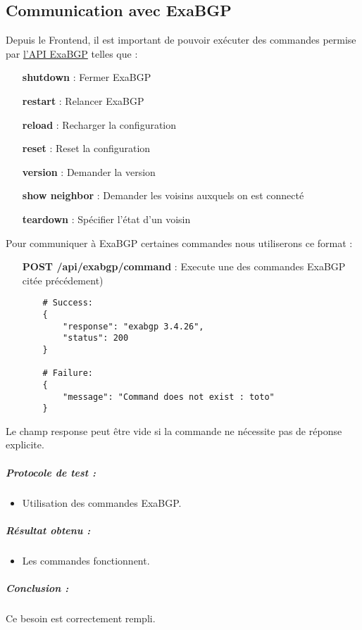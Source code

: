 \subsection{Communication avec ExaBGP}
\label{sssec:exabgp}
\noindent
Depuis le Frontend, il est important de pouvoir exécuter des commandes permise par \href{https://github.com/Exa-Networks/exabgp/wiki/Controlling-ExaBGP-:-interacting-from-the-API}{l'API ExaBGP} telles que :
\begin{itemize}
    \item[\textbf{shutdown}] : Fermer ExaBGP
    \item[\textbf{restart}] : Relancer ExaBGP
    \item[\textbf{reload}] : Recharger la configuration
    \item[\textbf{reset}] : Reset la configuration
    \item[\textbf{version}] : Demander la version
    \item[\textbf{show neighbor}] : Demander les voisins auxquels on est connecté
    \item[\textbf{teardown}] : Spécifier l'état d'un voisin
\end{itemize}

\vspace{1em}

Pour communiquer à ExaBGP certaines commandes nous utiliserons ce format :
\begin{itemize}

    \item [\textbf{POST /api/exabgp/command}] : Execute une des commandes ExaBGP citée précédement)
    \begin{verbatim}
    # Success:
    {
        "response": "exabgp 3.4.26",
        "status": 200
    }

    # Failure:
    {
        "message": "Command does not exist : toto"
    }
    \end{verbatim}

\end{itemize}

Le champ response peut être vide si la commande ne nécessite pas de réponse explicite.

\subparagraph{Protocole de test :}
\begin{itemize}
    \item Utilisation des commandes ExaBGP.
\end{itemize}
\subparagraph{Résultat obtenu :}
    \begin{itemize}
    \item Les commandes fonctionnent.
\end{itemize}
\subparagraph{Conclusion :}Ce besoin est correctement rempli.


